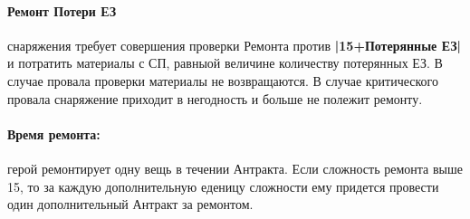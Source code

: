 \paragraph{Ремонт Потери ЕЗ} снаряжения требует совершения проверки Ремонта против \textbf{|15+Потерянные ЕЗ|} и потратить материалы с СП, равныой величине количеству потерянных ЕЗ. В случае провала проверки материалы не возвращаются. В случае критического провала снаряжение приходит в негодность и больше не полежит ремонту.
\paragraph{Время ремонта:} герой ремонтирует одну вещь в течении Антракта. Если сложность ремонта выше 15, то за каждую дополнительную еденицу сложности ему придется провести один дополнительный Антракт за ремонтом.
